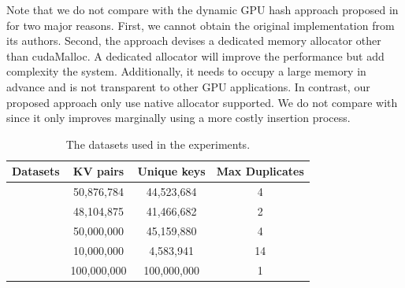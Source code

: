 Note that we do not compare with the dynamic GPU hash approach proposed in \cite{ashkiani2018dynamic} for two major reasons. First, we cannot obtain the original implementation from its authors. Second, the approach devises a dedicated memory allocator other than cudaMalloc. A dedicated allocator will improve the performance but add complexity the system. Additionally, it needs to occupy a large memory in advance and is not transparent to other GPU applications.
In contrast, our proposed approach only use native allocator supported. 
We do not compare with \cite{breslow2016horton} since it only improves \megakv marginally using a more costly insertion process.

\begin{table}[t]
	\caption{The datasets used in the experiments.}
	\label{table:exp_data_sets}
	\centering
	\begin{tabular}{|c|c|c|c|}
		\hline
		Datasets & KV pairs & Unique keys & Max Duplicates \\ \hline
		\dstwitter &50,876,784 & 44,523,684&4\\ \hline
		\dsreddit & 48,104,875 & 41,466,682 &2 \\ \hline
		\dstpch &50,000,000 & 45,159,880&4\\ \hline
		\dsali &10,000,000 & 4,583,941&14\\ \hline
		\dsrandom & 100,000,000& 100,000,000& 1 \\ \hline
	\end{tabular}
\end{table}

